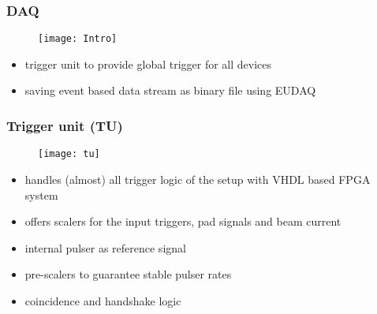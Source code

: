 \begin{frame}
	\frametitle{DAQ}
	\begin{figure}
		\centering
		\texttt{[image: Intro]}
	\end{figure}
	\begin{itemize}
		\item trigger unit to provide global trigger for all devices
		\item saving event based data stream as binary file using EUDAQ
	\end{itemize}
\end{frame}
\begin{frame}
	\frametitle{Trigger unit (TU)}
	\begin{figure}
		\centering
		\texttt{[image: tu]}
	\end{figure}
	\begin{itemize}
		\setlength{\itemsep}{\fill}
		\item handles (almost) all trigger logic of the setup with VHDL based FPGA system
		\item offers scalers for the input triggers, pad signals and beam current
		\item internal pulser as reference signal
		\item pre-scalers to guarantee stable pulser rates
		\item coincidence and handshake logic
	\end{itemize}
\end{frame}
